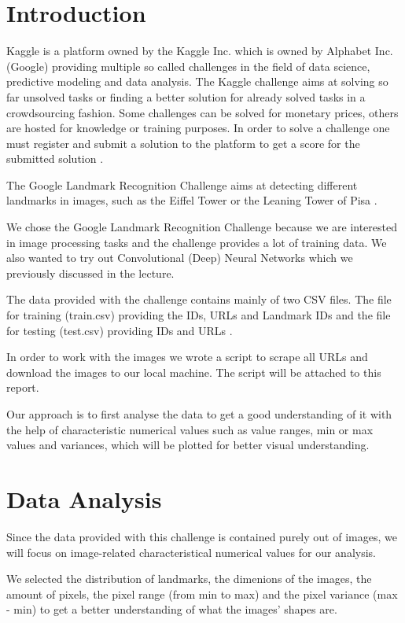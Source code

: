 \chapter{Introduction}

Kaggle is a platform owned by the Kaggle Inc. which is owned by Alphabet Inc. (Google) providing multiple so called challenges in the field of data science, predictive modeling and data analysis. The Kaggle challenge aims at solving so far unsolved tasks or finding a better solution for already solved tasks in a crowdsourcing fashion. Some challenges can be solved for monetary prices, others are hosted for knowledge or training purposes. In order to solve a challenge one must register and submit a solution to the platform to get a score for the submitted solution \cite{kaggle}.

The Google Landmark Recognition Challenge aims at detecting different landmarks in images, such as the Eiffel Tower or the Leaning Tower of Pisa \cite{challenge}.

We chose the Google Landmark Recognition Challenge because we are interested in image processing tasks and the challenge provides a lot of training data. We also wanted to try out Convolutional (Deep) Neural Networks which we previously discussed in the lecture.

The data provided with the challenge contains mainly of two CSV files. The file for training (train.csv) providing the IDs, URLs and Landmark IDs and the file for testing (test.csv) providing IDs and URLs \cite{data}.

In order to work with the images we wrote a script to scrape all URLs and download the images to our local machine. The script will be attached to this report.

Our approach is to first analyse the data to get a good understanding of it with the help of characteristic numerical values such as value ranges, min or max values and variances, which will be plotted for better visual understanding.

\chapter{Data Analysis}
\label{cha:data}

Since the data provided with this challenge is contained purely out of images, we will focus on image-related characteristical numerical values for our analysis.

We selected the distribution of landmarks, the dimenions of the images, the amount of pixels, the pixel range (from min to max) and the pixel variance (max - min) to get a better understanding of what the images' shapes are. 

